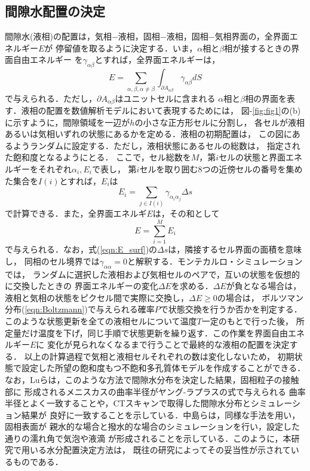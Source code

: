 \subsection{間隙水配置の決定\cite{MC,Kimoto}}
間隙水(液相)の配置は，気相−液相，固相−液相，固相−気相界面の，全界面エネルギー$E$が
停留値を取るように決定する．いま，$\alpha$相と$\beta$相が接するときの界面自由エネルギー
を$\gamma_{\alpha \beta}$とすれば，全界面エネルギーは，
\begin{equation}
	E=\sum_{\alpha,\beta, \alpha\neq\beta}
	\int_{\partial A_{\alpha\beta}}\gamma_{\alpha \beta}dS
\end{equation}
で与えられる．ただし，$\partial A_{\alpha\beta}$はユニットセルに含まれる
$\alpha$相と$\beta$相の界面を表す．液相の配置を数値解析モデルにおいて表現するためには，
図-\ref{fig:fig1}の(b)に示すように，間隙領域を一辺が$h$の小さな正方形セルに分割し，
各セルが液相あるいは気相いずれの状態にあるかを定める．液相の初期配置は，
この図にあるようランダムに設定する．ただし，液相状態にあるセルの総数は，
指定された飽和度となるようにとる．
ここで，セル総数を$M$，第$i$セルの状態と界面エネルギーをそれぞれ$\alpha_i, E_i$で表し，
第$i$セルを取り囲む8つの近傍セルの番号を集めた集合を$I(i)$とすれば，$E_i$は
\begin{equation}
	E_i=\sum_{j\in I(i)}\gamma_{\alpha_i \alpha_j}\Delta s
	\label{eqn:E_surf}
\end{equation}
で計算できる．また，全界面エネルギ$E$は，その和として
\begin{equation}
	E=\sum_{i=1}^{M}E_i
	\label{eqn:Etot}
\end{equation}
で与えられる．なお，式(\ref{eqn:E_surf})の$\Delta s$は，隣接するセル界面の面積を意味し，
同相のセル境界では$\gamma_{\alpha\alpha}=0$と解釈する．モンテカルロ・シミュレーションでは，
ランダムに選択した液相および気相セルのペアで，互いの状態を仮想的に交換したときの
界面エネルギーの変化$\Delta E$を求める．$\Delta E$が負となる場合は，
液相と気相の状態をピクセル間で実際に交換し，$\Delta E \geq 0$の場合は，
ボルツマン分布(\ref{eqn:Boltzmann})で与えられる確率$P$で状態交換を行うか否かを判定する．
このような状態更新を全ての液相セルについて温度$T$一定のもとで行った後，
所定量だけ温度を下げ，同じ手順で状態更新を繰り返す．この作業を界面自由エネルギー$E$に
変化が見られなくなるまで行うことで最終的な液相の配置を決定する．
以上の計算過程で気相と液相セルそれぞれの数は変化しないため，
初期状態で設定した所望の飽和度もつ不飽和多孔質体モデルを作成することができる．
なお，Luら\cite{MC}は，このような方法で間隙水分布を決定した結果，固相粒子の接触部に
形成されるメニスカスの曲率半径がヤング-ラプラスの式\cite{SurfChem}で与えられる
曲率半径とよく一致することや，CTスキャンで取得した間隙水分布とシミュレーション結果が
良好に一致することを示している．中島ら\cite{Kimoto}は，同様な手法を用い，固相表面が
親水的な場合と撥水的な場合のシミュレーションを行い，設定した通りの濡れ角で気泡や液滴
が形成されることを示している．このように，本研究で用いる水分配置決定方法は，
既往の研究によってその妥当性が示されているものである．
